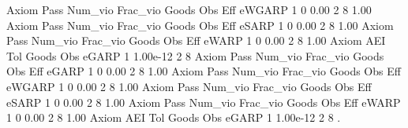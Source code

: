 {\smallskip}
{\smallskip}
{\smallskip}
       Axiom {\VBAR} Pass     Num_vio    Frac_vio       Goods         Obs         Eff  
      eWGARP {\VBAR}    1           0        0.00           2           8        1.00  
{\smallskip}
{\smallskip}
{\smallskip}
       Axiom {\VBAR} Pass     Num_vio    Frac_vio       Goods         Obs         Eff  
       eSARP {\VBAR}    1           0        0.00           2           8        1.00  
{\smallskip}
{\smallskip}
{\smallskip}
       Axiom {\VBAR} Pass     Num_vio    Frac_vio       Goods         Obs         Eff  
       eWARP {\VBAR}    1           0        0.00           2           8        1.00  
{\smallskip}
       Axiom {\VBAR}       AEI        Tol      Goods        Obs 
       eGARP {\VBAR}         1   1.00e-12          2          8 
{\smallskip}
{\smallskip}
{\smallskip}
       Axiom {\VBAR} Pass     Num_vio    Frac_vio       Goods         Obs         Eff  
       eGARP {\VBAR}    1           0        0.00           2           8        1.00  
{\smallskip}
{\smallskip}
{\smallskip}
       Axiom {\VBAR} Pass     Num_vio    Frac_vio       Goods         Obs         Eff  
      eWGARP {\VBAR}    1           0        0.00           2           8        1.00  
{\smallskip}
{\smallskip}
{\smallskip}
       Axiom {\VBAR} Pass     Num_vio    Frac_vio       Goods         Obs         Eff  
       eSARP {\VBAR}    1           0        0.00           2           8        1.00  
{\smallskip}
{\smallskip}
{\smallskip}
       Axiom {\VBAR} Pass     Num_vio    Frac_vio       Goods         Obs         Eff  
       eWARP {\VBAR}    1           0        0.00           2           8        1.00  
{\smallskip}
       Axiom {\VBAR}       AEI        Tol      Goods        Obs 
       eGARP {\VBAR}         1   1.00e-12          2          8 
{\smallskip}
. 
